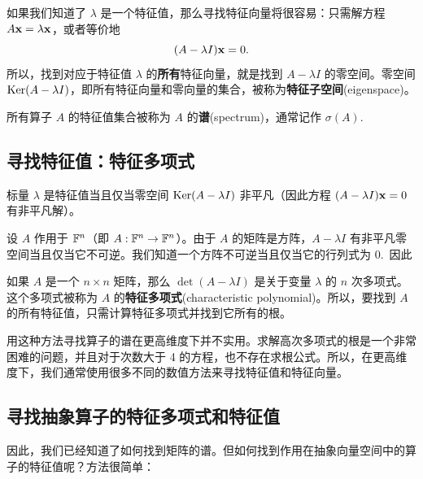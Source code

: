 如果我们知道了 $\lambda$ 是一个特征值，那么寻找特征向量将很容易：只需解方程 $A\mathbf{x} = \lambda \mathbf{x}$，或者等价地 $$(A - \lambda I)\mathbf{x} = 0.$$
所以，找到对应于特征值 $\lambda$ 的\textbf{所有}特征向量，就是找到 $A - \lambda I$ 的零空间。零空间 $\operatorname{Ker}(A - \lambda I)$，即所有特征向量和零向量的集合，被称为\textbf{特征子空间}(eigenspace)。

所有算子 $A$ 的特征值集合被称为 $A$ 的\textbf{谱}(spectrum)，通常记作 $\sigma(A)$.~

\subsection{寻找特征值：特征多项式}\label{sec:04-01-02}

标量 $\lambda$ 是特征值当且仅当零空间 $\operatorname{Ker}(A - \lambda I)$ 非平凡（因此方程 $(A - \lambda I)\mathbf{x} = 0$ 有非平凡解）。

设 $A$ 作用于 $\mathbb{F}^n$（即 $A: \mathbb{F}^n \to \mathbb{F}^n$）。由于 $A$ 的矩阵是方阵，$A - \lambda I$ 有非平凡零空间当且仅当它不可逆。我们知道一个方阵不可逆当且仅当它的行列式为 $0$.~因此

{}

如果 $A$ 是一个 $n \times n$ 矩阵，那么 $\det(A - \lambda I)$ 是关于变量 $\lambda$ 的 $n$ 次多项式。这个多项式被称为 $A$ 的\textbf{特征多项式}(characteristic polynomial)。所以，要找到 $A$ 的所有特征值，只需计算特征多项式并找到它所有的根。

用这种方法寻找算子的谱在更高维度下并不实用。求解高次多项式的根是一个非常困难的问题，并且对于次数大于 4 的方程，也不存在求根公式。所以，在更高维度下，我们通常使用很多不同的数值方法来寻找特征值和特征向量。

\subsection{寻找抽象算子的特征多项式和特征值}\label{sec:04-01-03}

因此，我们已经知道了如何找到矩阵的谱。但如何找到作用在抽象向量空间中的算子的特征值呢？方法很简单：

{}


